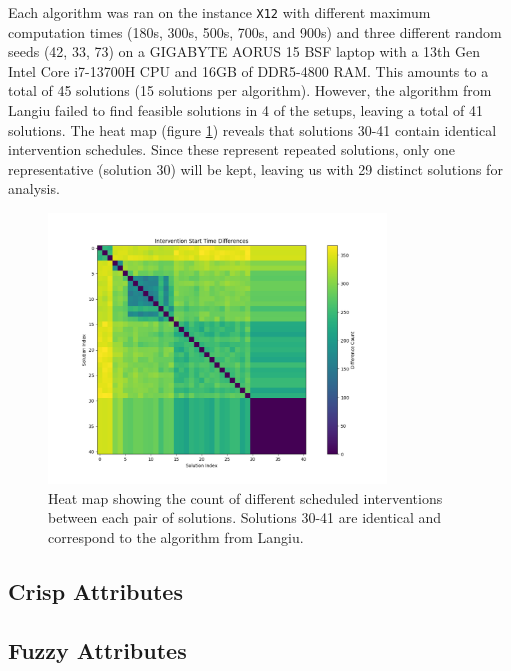Each algorithm was ran on the instance \texttt{X12} with different maximum computation times (180s, 300s, 500s, 700s, and 900s) and three different random seeds (42, 33, 73) on a GIGABYTE AORUS 15 BSF laptop with a 13th Gen Intel Core i7-13700H CPU and 16GB of DDR5-4800 RAM. This amounts to a total of 45 solutions (15 solutions per algorithm). However, the algorithm from Langiu failed to find feasible solutions in 4 of the setups, leaving a total of 41 solutions. The heat map (figure \ref{fig:dif_sol}) reveals that solutions 30-41 contain identical intervention schedules. Since these represent repeated solutions, only one representative (solution 30) will be kept, leaving us with 29 distinct solutions for analysis.

\begin{figure}[ht]
    \centering
    \includegraphics[width=0.8\textwidth]{ch3/figures/diff_sol.png}
    \caption{Heat map showing the count of different scheduled interventions between each pair of solutions. Solutions 30-41 are identical and correspond to the algorithm from Langiu.}
    \label{fig:dif_sol}
\end{figure}









\subsection{Crisp Attributes}


\clearpage
\subsection{Fuzzy Attributes}

